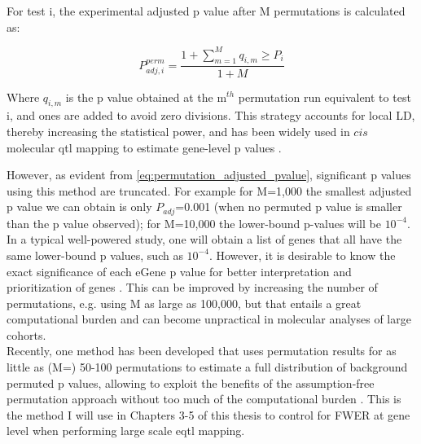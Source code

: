 For test i, the experimental adjusted p value after M permutations is calculated as:

\begin{equation}\label{eq:permutation_adjusted_pvalue}
    P_{adj,i}^{perm} = \frac{1+\sum_{m=1}^{M} q_{i,m} \geq P_i}{1+M}
\end{equation}

Where $q_{i,m}$ is the p value obtained at the m$^{th}$ permutation run equivalent to test i, and ones are added to avoid zero divisions.  
This strategy accounts for local LD, thereby increasing the statistical power, and has been widely used in $cis$ molecular \gls{qtl} mapping to estimate gene-level p values \cite{gtex2015genotype}.  


However, as evident from \eqref{eq:permutation_adjusted_pvalue}, significant p values using this method are truncated.
For example for M=1,000 the smallest adjusted p value we can obtain is only $P_{adj}$=0.001 (when no permuted p value is smaller than the p value observed); for M=10,000 the lower-bound p-values will be $10^{-4}$. 
In a typical well-powered study, one will obtain a list of genes that all have the same lower-bound p values, such as $10^{-4}$. 
However, it is desirable to know the exact significance of each eGene p value for better interpretation and prioritization of genes \cite{sul2015accurate}.
This can be improved by increasing the number of permutations, e.g. using M as large as 100,000, but that entails a great computational burden and can become unpractical in molecular analyses of large cohorts.\\

Recently, one method has been developed that uses permutation results for as little as (M=) 50-100 permutations to estimate a full distribution of background permuted p values, allowing to exploit the benefits of the assumption-free permutation approach without too much of the computational burden \cite{ongen2016fast}. 
This is the method I will use in Chapters 3-5 of this thesis to control for FWER at gene level when performing large scale e\gls{qtl} mapping.

